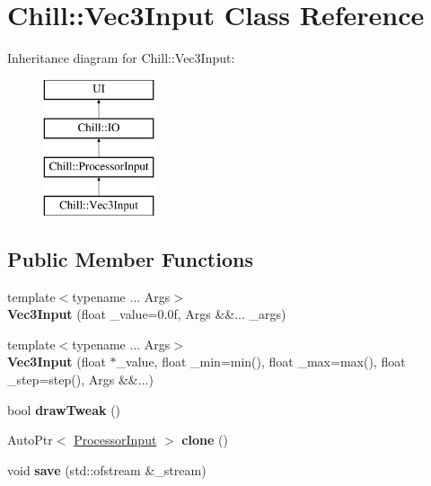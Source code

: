 \hypertarget{class_chill_1_1_vec3_input}{}\section{Chill\+:\+:Vec3\+Input Class Reference}
\label{class_chill_1_1_vec3_input}
Inheritance diagram for Chill\+:\+:Vec3\+Input\+:\begin{figure}[H]
\begin{center}
\leavevmode
\includegraphics[height=4.000000cm]{class_chill_1_1_vec3_input}
\end{center}
\end{figure}
\subsection*{Public Member Functions}
\begin{DoxyCompactItemize}
\item 
\mbox{\label{class_chill_1_1_vec3_input_a2340c3853f43091e59edcc2ce8f186dc}} 
{\footnotesize template$<$typename ... Args$>$ }\\{\bfseries Vec3\+Input} (float \+\_\+value=0.\+0f, Args \&\&... \+\_\+args)
\item 
\mbox{\label{class_chill_1_1_vec3_input_a7909e5998130ae3bf00838b6becfc3a7}} 
{\footnotesize template$<$typename ... Args$>$ }\\{\bfseries Vec3\+Input} (float $\ast$\+\_\+value, float \+\_\+min=min(), float \+\_\+max=max(), float \+\_\+step=step(), Args \&\&...)
\item 
\mbox{\label{class_chill_1_1_vec3_input_a9f4c1d5907e0f4f4625b94858586585f}} 
bool {\bfseries draw\+Tweak} ()
\item 
\mbox{\label{class_chill_1_1_vec3_input_a24d5f2814c131de79a49fdc71f2579d6}} 
Auto\+Ptr$<$ \mbox{\hyperlink{class_chill_1_1_processor_input}{Processor\+Input}} $>$ {\bfseries clone} ()
\item 
\mbox{\label{class_chill_1_1_vec3_input_ae37b296788799e66846d04d39cd89246}} 
void {\bfseries save} (std\+::ofstream \&\+\_\+stream)
\end{DoxyCompactItemize}
